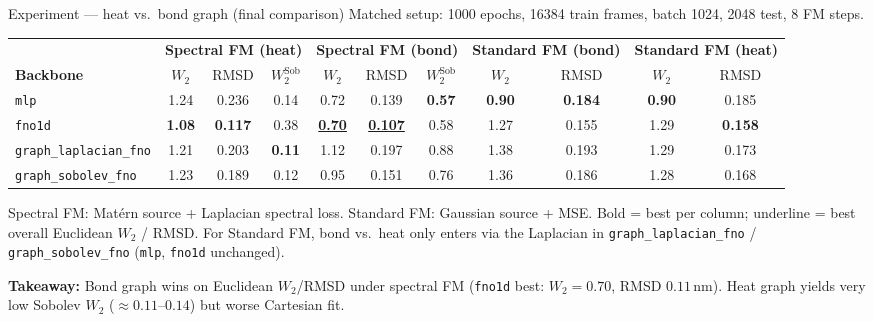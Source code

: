\documentclass[aspectratio=169,11pt]{beamer}
\begin{document}
\begin{frame}{Experiment --- heat vs.\ bond graph (final comparison)}
  \tiny
  Matched setup: 1000 epochs, 16384 train frames, batch 1024, 2048 test, 8 FM steps.

  \vspace{0.15em}
  \begin{table}
    \centering
    \setlength{\tabcolsep}{2pt}
    \begin{tabular}{@{}l ccc ccc cc cc@{}}
      \toprule
      & \multicolumn{3}{c}{\textbf{Spectral FM (heat)}} &
        \multicolumn{3}{c}{\textbf{Spectral FM (bond)}} &
        \multicolumn{2}{c}{\textbf{Standard FM (bond)}} &
        \multicolumn{2}{c}{\textbf{Standard FM (heat)}} \\
      \cmidrule(lr){2-4} \cmidrule(lr){5-7} \cmidrule(lr){8-9} \cmidrule(lr){10-11}
      \textbf{Backbone} &
      $W_2$ & RMSD & $W_2^{\mathrm{Sob}}$ &
      $W_2$ & RMSD & $W_2^{\mathrm{Sob}}$ &
      $W_2$ & RMSD &
      $W_2$ & RMSD \\
      \midrule
      \texttt{mlp} &
      1.24 & 0.236 & 0.14 &
      0.72 & 0.139 & \textbf{0.57} &
      \textbf{0.90} & \textbf{0.184} & \textbf{0.90} & 0.185 \\
      \texttt{fno1d} &
      \textbf{1.08} & \textbf{0.117} & 0.38 &
      \textbf{\underline{0.70}} & \textbf{\underline{0.107}} & 0.58 &
      1.27 & 0.155 & 1.29 & \textbf{0.158} \\
      \texttt{graph\_laplacian\_fno} &
      1.21 & 0.203 & \textbf{0.11} &
      1.12 & 0.197 & 0.88 &
      1.38 & 0.193 & 1.29 & 0.173 \\
      \texttt{graph\_sobolev\_fno} &
      1.23 & 0.189 & 0.12 &
      0.95 & 0.151 & 0.76 &
      1.36 & 0.186 & 1.28 & 0.168 \\
      \bottomrule
    \end{tabular}
  \end{table}

  \vspace{0.15em}
  \scriptsize
  Spectral FM: Mat\'ern source + Laplacian spectral loss. Standard FM: Gaussian source + MSE.
  Bold = best per column; underline = best overall Euclidean $W_2$ / RMSD.
  For Standard FM, bond vs.\ heat only enters via the Laplacian in \texttt{graph\_laplacian\_fno} / \texttt{graph\_sobolev\_fno} (\texttt{mlp}, \texttt{fno1d} unchanged).

  \vspace{0.15em}
  \normalsize
  \textbf{Takeaway:} Bond graph wins on Euclidean $W_2$/RMSD under spectral FM (\texttt{fno1d} best: $W_2{=}0.70$, RMSD $0.11$\,nm). Heat graph yields very low Sobolev $W_2$ ($\approx 0.11$--$0.14$) but worse Cartesian fit.
\end{frame}
\end{document}

